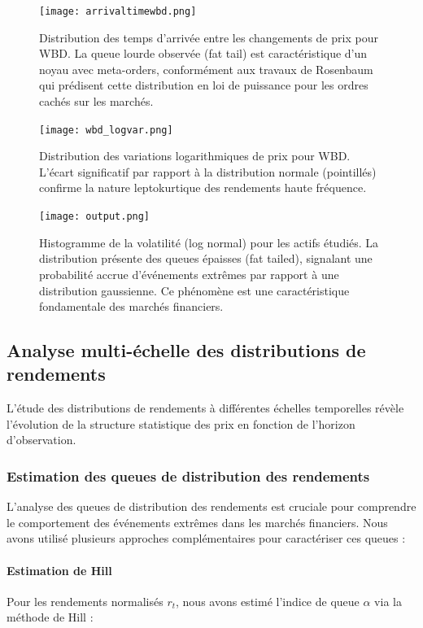 \documentclass[10pt,a4paper]{article}
\theoremstyle{definition}
\theoremstyle{remark}
\begin{document}
\begin{itemize}
\begin{figure}[h!]
    \centering
    \texttt{[image: arrivaltimewbd.png]}
    \caption{Distribution des temps d'arrivée entre les changements de prix pour WBD. La queue lourde observée (fat tail) est caractéristique d'un noyau avec meta-orders, conformément aux travaux de Rosenbaum qui prédisent cette distribution en loi de puissance pour les ordres cachés sur les marchés.}
    \label{fig:arrival_times_wbd}
\end{figure}

\begin{figure}[h!]
    \centering
    \texttt{[image: wbd\_logvar.png]}
    \caption{Distribution des variations logarithmiques de prix pour WBD. L'écart significatif par rapport à la distribution normale (pointillés) confirme la nature leptokurtique des rendements haute fréquence.}
    \label{fig:log_variations_wbd}
\end{figure}

\begin{figure}[h!]
    \centering
    \texttt{[image: output.png]}
    \caption{Histogramme de la volatilité (log normal) pour les actifs étudiés. La distribution présente des queues épaisses (fat tailed), signalant une probabilité accrue d'événements extrêmes par rapport à une distribution gaussienne. Ce phénomène est une caractéristique fondamentale des marchés financiers.}
    \label{fig:volatility_hist}
\end{figure}

\subsection{Analyse multi-échelle des distributions de rendements}

L'étude des distributions de rendements à différentes échelles temporelles révèle l'évolution de la structure statistique des prix en fonction de l'horizon d'observation.

\subsubsection{Estimation des queues de distribution des rendements}

L'analyse des queues de distribution des rendements est cruciale pour comprendre le comportement des événements extrêmes dans les marchés financiers. Nous avons utilisé plusieurs approches complémentaires pour caractériser ces queues :

\paragraph{Estimation de Hill}
Pour les rendements normalisés $r_t$, nous avons estimé l'indice de queue $\alpha$ via la méthode de Hill :


\end{itemize}
\end{document}
